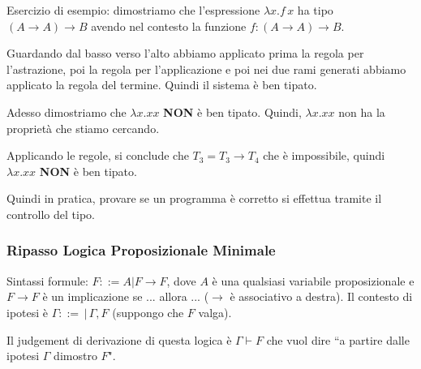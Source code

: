 \documentclass{article}
\begin{document}
\bigskip

Esercizio di esempio: dimostriamo che l'espressione $\lambda x. f\, x$ ha tipo $(A\to A)\to B$ avendo nel contesto la funzione $f:(A\to A)\to B$.

\bigskip


\bigskip

Guardando dal basso verso l'alto abbiamo applicato prima la regola per l'astrazione, poi la regola per l'applicazione e poi nei due rami generati abbiamo applicato la regola del termine. Quindi il sistema è ben tipato.

\bigskip

Adesso dimostriamo che $\lambda x.xx$ \textbf{NON} è ben tipato. Quindi, $\lambda x.xx$ non ha la proprietà che stiamo cercando.

\bigskip


\bigskip

Applicando le regole, si conclude che $T_3 = T_3 \to T_4$ che è impossibile, quindi $\lambda x.xx$ \textbf{NON} è ben tipato.

\bigskip

Quindi in pratica, provare se un programma è corretto si effettua tramite il controllo del tipo. 

\subsubsection{Ripasso Logica Proposizionale Minimale}
Sintassi formule: $F::= A | F\to F$, dove $A$ è una qualsiasi variabile proposizionale e $F\to F$ è un implicazione se ... allora ... ($\to$ è associativo a destra). Il contesto di ipotesi è $\Gamma ::=\, |\, \Gamma,F$ (suppongo che $F$ valga). 

\bigskip

Il judgement di derivazione di questa logica è $\Gamma\vdash F$ che vuol dire ``a partire dalle ipotesi $\Gamma$ dimostro $F$".
\end{document}
